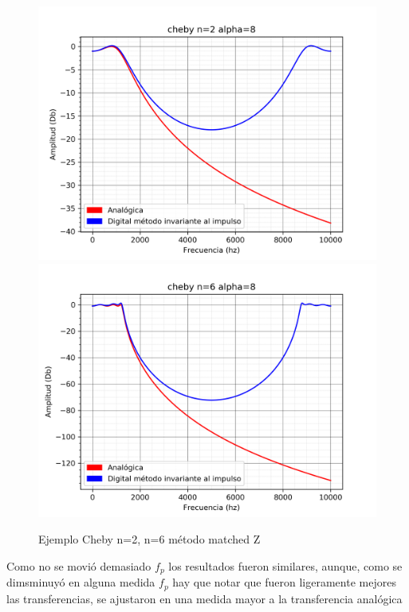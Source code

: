 \documentclass[assd_guia_filtros_recursivos_main.tex]{subfiles}
\begin{document}
\begin{figure}[H]	
	\centering
	\includegraphics[scale=0.4]{output/cheby_matched_z/alpha=8/cheby_n=2.png}
	\includegraphics[scale=0.4]{output/cheby_matched_z/alpha=8/cheby_n=6.png}
	\caption{Ejemplo Cheby n=2, n=6 método matched Z}
	\label{fig:Caso 6}
\end{figure}

Como no se movió demasiado $f_p$ los resultados fueron similares, aunque, como se dimsminuyó en alguna medida $f_p$ hay que notar que fueron ligeramente mejores las transferencias, se ajustaron en una medida mayor a la transferencia analógica
\end{document}
